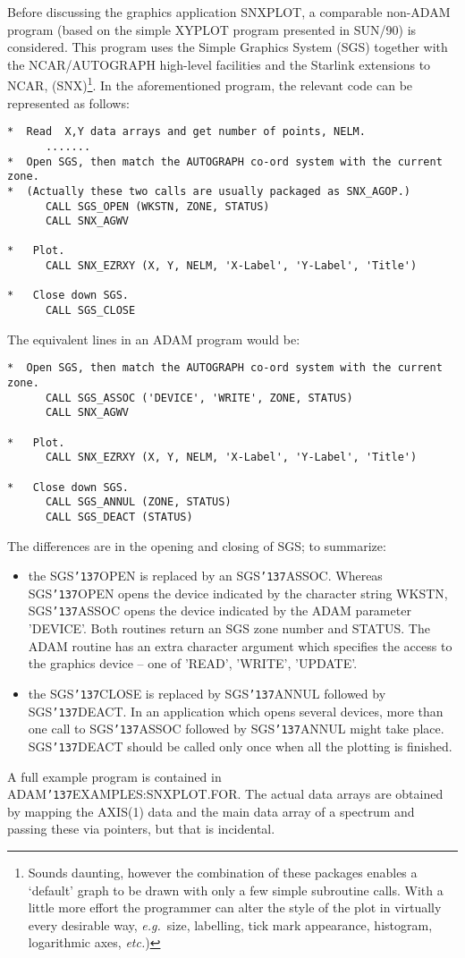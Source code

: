 \documentclass[twoside,11pt]{article}
\renewcommand{\_}{{\tt\char'137}}
\newcommand{\xref}[3]{#1}
\begin{document}
Before discussing the graphics application SNXPLOT,
a comparable non-ADAM program
(based on the simple XYPLOT program presented in
\xref{SUN/90}{sun90}{}) is considered.
This program uses the Simple Graphics System (SGS) together with the
NCAR/AUTOGRAPH high-level facilities and the Starlink extensions to NCAR,
(SNX)\footnote{Sounds daunting, however the combination of these packages
enables a `default' graph to be drawn with only a few simple subroutine calls.
With a little more effort the programmer can alter  the style of the plot
in virtually every desirable way,
{\it e.g.}\ size, labelling, tick mark appearance, histogram, logarithmic
axes,  {\it etc.})}.
In the aforementioned program, the relevant code can be
represented as follows:
\begin{verbatim}
*  Read  X,Y data arrays and get number of points, NELM.
      .......
*  Open SGS, then match the AUTOGRAPH co-ord system with the current zone.
*  (Actually these two calls are usually packaged as SNX_AGOP.)
      CALL SGS_OPEN (WKSTN, ZONE, STATUS)
      CALL SNX_AGWV

*   Plot.
      CALL SNX_EZRXY (X, Y, NELM, 'X-Label', 'Y-Label', 'Title')

*   Close down SGS.
      CALL SGS_CLOSE
\end{verbatim}
The equivalent lines in an ADAM program would be:
\begin{verbatim}
*  Open SGS, then match the AUTOGRAPH co-ord system with the current zone.
      CALL SGS_ASSOC ('DEVICE', 'WRITE', ZONE, STATUS)
      CALL SNX_AGWV

*   Plot.
      CALL SNX_EZRXY (X, Y, NELM, 'X-Label', 'Y-Label', 'Title')

*   Close down SGS.
      CALL SGS_ANNUL (ZONE, STATUS)
      CALL SGS_DEACT (STATUS)
\end{verbatim}
The differences are in the opening and closing of SGS; to summarize:
\begin{itemize}
\item the SGS\_OPEN is replaced by an SGS\_ASSOC.
Whereas SGS\_OPEN opens the device indicated by the character string WKSTN,
SGS\_ASSOC opens the device indicated by the ADAM parameter 'DEVICE'.
Both routines return an SGS zone number and STATUS. The ADAM routine has an
extra character argument which specifies the access to the graphics device
-- one of 'READ', 'WRITE', 'UPDATE'.
\item the SGS\_CLOSE is replaced by SGS\_ANNUL followed by SGS\_DEACT.
In an application which opens several devices, more than
one call to SGS\_ASSOC followed by SGS\_ANNUL might take place.
SGS\_DEACT should be called only once when all the
plotting is finished.
\end{itemize}
A full example program is contained in ADAM\_EXAMPLES:SNXPLOT.FOR.
The actual data arrays are obtained by mapping the AXIS(1) data and the
main data array of a spectrum and passing these via  pointers,
but that is incidental.
\end{document}
